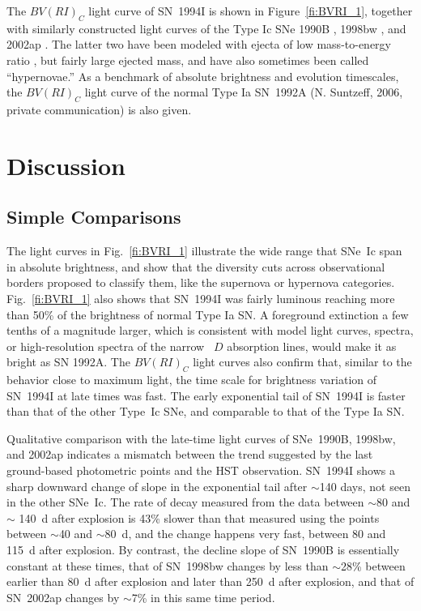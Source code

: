 \documentclass[12pt,manuscript]{aastex}
\begin{document}
The $BV(RI)_C$ light curve of SN~1994I is shown in 
Figure~\ref{fi:BVRI_1}, together with similarly constructed 
light curves of the Type Ic SNe 1990B \citep{cetal01}, 1998bw 
\citep{petal01,soetal02,cetal07}, and 2002ap \citep{tetal06}.
%
The latter two have been modeled with ejecta of low 
mass-to-energy ratio \citep{ietal98,metal02},
but fairly large ejected mass, and have also sometimes been 
called ``hypernovae.''
%
As a benchmark of absolute brightness and evolution timescales,
the $BV(RI)_C$ light curve of the normal Type Ia SN~1992A (N. 
Suntzeff, 2006, private communication) is also given.


\section{Discussion} \label{se:discussion}

\subsection{Simple Comparisons} \label{sse:simple}

The light curves in Fig.~\ref{fi:BVRI_1} illustrate the 
wide range that SNe~Ic span in absolute brightness, and 
show that the diversity cuts across observational borders 
proposed to classify them, like the supernova or hypernova 
categories.
%
Fig.~\ref{fi:BVRI_1} also shows that SN~1994I
was fairly luminous reaching more than 50\% of
the brightness of normal Type Ia SN.
%
A foreground extinction a few tenths of a magnitude larger,
which is consistent with model light
curves, spectra, or high-resolution spectra of the narrow
~$D$ absorption lines, would
make it as bright as SN 1992A.
%
The $BV(RI)_C$ light curves also confirm that, similar to 
the behavior close to maximum light, the time scale for 
brightness variation of SN~1994I at late times was fast.
%
The early exponential tail of SN~1994I is faster than that of
the other Type~Ic SNe, and comparable to that of the Type Ia
SN.

Qualitative comparison with the late-time light curves of 
SNe~1990B, 1998bw, and 2002ap indicates a mismatch between the
trend suggested by the last ground-based photometric
points and the HST observation.
%
SN~1994I shows a sharp downward change of slope in the
exponential tail after $\sim$140 days, not seen in the other
SNe~Ic.
%
The rate of decay measured from the data between $\sim$80 and 
$\sim$ 140~d after explosion is 43\% slower than that measured 
using the points between $\sim$40 and $\sim$80~d, and the change 
happens very fast, between 80 and 115~d after explosion.
%
By contrast, the decline slope of SN~1990B is essentially 
constant at these times, that of SN~1998bw changes by 
less than $\sim$28\% between earlier than 80~d after explosion 
and later than 250~d after explosion, and that of SN~2002ap 
changes by $\sim$7\% in this same time period.
\end{document}
